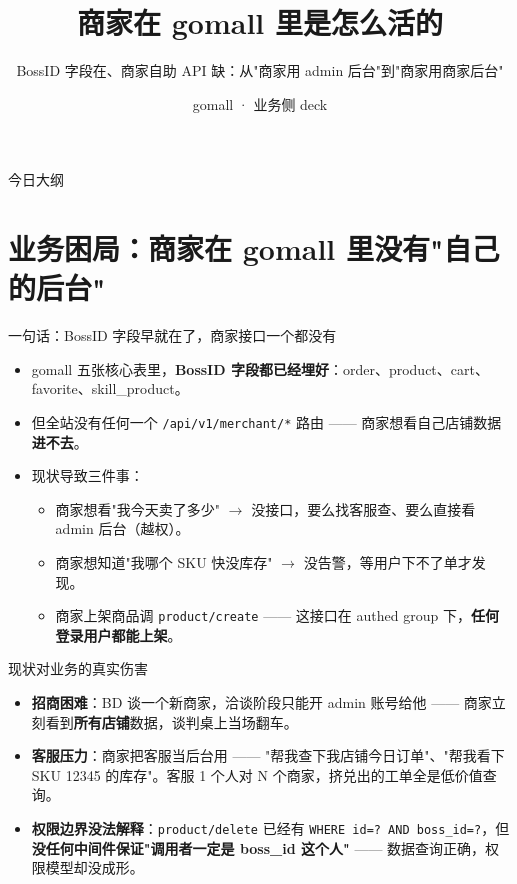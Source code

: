 

\title{商家在 gomall 里是怎么活的}
\subtitle{BossID 字段在、商家自助 API 缺：从"商家用 admin 后台"到"商家用商家后台"}
\author{gomall · 业务侧 deck}
\date{}



\maketitle

\begin{frame}{今日大纲}
\tableofcontents
\end{frame}

\section{业务困局：商家在 gomall 里没有"自己的后台"}

\begin{frame}{一句话：BossID 字段早就在了，商家接口一个都没有}
\begin{itemize}
  \item gomall 五张核心表里，\textbf{BossID 字段都已经埋好}：order、product、cart、favorite、skill\_product。
  \item 但全站没有任何一个 \texttt{/api/v1/merchant/*} 路由 —— 商家想看自己店铺数据\textbf{进不去}。
  \item 现状导致三件事：
  \begin{itemize}
    \item 商家想看"我今天卖了多少" $\to$ 没接口，要么找客服查、要么直接看 admin 后台（越权）。
    \item 商家想知道"我哪个 SKU 快没库存" $\to$ 没告警，等用户下不了单才发现。
    \item 商家上架商品调 \texttt{product/create} —— 这接口在 authed group 下，\textbf{任何登录用户都能上架}。
  \end{itemize}
\end{itemize}
\end{frame}

\begin{frame}{现状对业务的真实伤害}
\begin{itemize}
  \item \textbf{招商困难}：BD 谈一个新商家，洽谈阶段只能开 admin 账号给他 —— 商家立刻看到\textbf{所有店铺}数据，谈判桌上当场翻车。
  \item \textbf{客服压力}：商家把客服当后台用 —— "帮我查下我店铺今日订单"、"帮我看下 SKU 12345 的库存"。客服 1 个人对 N 个商家，挤兑出的工单全是低价值查询。
  \item \textbf{权限边界没法解释}：\texttt{product/delete} 已经有 \texttt{WHERE id=? AND boss\_id=?}，但\textbf{没任何中间件保证"调用者一定是 boss\_id 这个人"} —— 数据查询正确，权限模型却没成形。
\end{itemize}
\end{frame}

